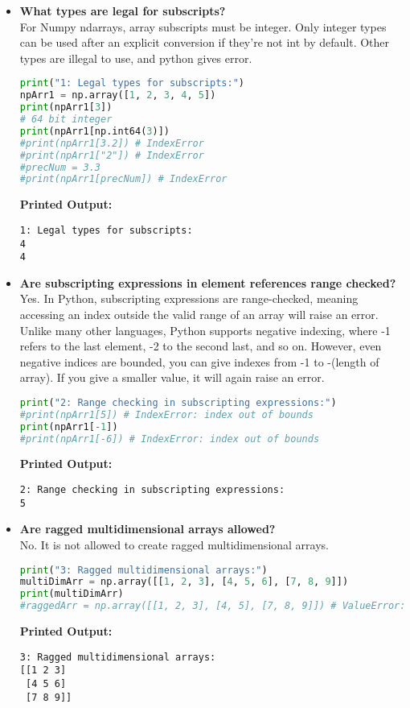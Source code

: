 \documentclass{article}
\begin{document}
\begin{itemize}
\item \textbf{What types are legal for subscripts?} \\
For Numpy ndarrays, array subscripts must be integer. Only integer types can be used after an explicit conversion if they’re not int by default. Other types are illegal to use, and python gives error. 
\begin{lstlisting}[language=Python]
print("1: Legal types for subscripts:")
npArr1 = np.array([1, 2, 3, 4, 5])
print(npArr1[3])
# 64 bit integer
print(npArr1[np.int64(3)])
#print(npArr1[3.2]) # IndexError
#print(npArr1["2"]) # IndexError
#precNum = 3.3
#print(npArr1[precNum]) # IndexError
\end{lstlisting}
\textbf{Printed Output:}
\begin{verbatim}
1: Legal types for subscripts:
4
4
\end{verbatim}


\item \textbf{Are subscripting expressions in element references range checked?} \\
Yes. In Python, subscripting expressions are range-checked, meaning accessing an index outside the valid range of an array will raise an error. Unlike many other languages, Python supports negative indexing, where -1 refers to the last element, -2 to the second last, and so on. However, even negative indices are bounded, you can give indexes from -1 to -(length of array). If you give a smaller value, it will again raise an error. 

\begin{lstlisting}[language=Python]
print("2: Range checking in subscripting expressions:")
#print(npArr1[5]) # IndexError: index out of bounds
print(npArr1[-1])
#print(npArr1[-6]) # IndexError: index out of bounds
\end{lstlisting}
\textbf{Printed Output:}
\begin{verbatim}
2: Range checking in subscripting expressions:
5
\end{verbatim}


\item \textbf{Are ragged multidimensional arrays allowed?} \\
No. It is not allowed to create ragged multidimensional arrays.
\begin{lstlisting}[language=Python]
print("3: Ragged multidimensional arrays:")
multiDimArr = np.array([[1, 2, 3], [4, 5, 6], [7, 8, 9]])
print(multiDimArr)
#raggedArr = np.array([[1, 2, 3], [4, 5], [7, 8, 9]]) # ValueError: The requested array has an inhomogeneous shape.
\end{lstlisting}
\textbf{Printed Output:}
\begin{verbatim}
3: Ragged multidimensional arrays:
[[1 2 3]
 [4 5 6]
 [7 8 9]]
\end{verbatim}




\end{itemize}
\end{document}
